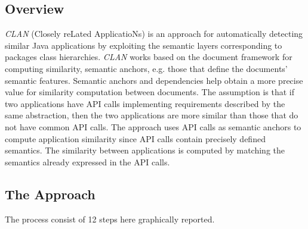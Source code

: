 \subsection{Overview}

\textit{CLAN} (Closely reLated ApplicatioNs) \cite{McMillan:2012:DSS:2337223.2337267} is an approach for automatically detecting similar Java applications by exploiting the semantic layers corresponding to packages class hierarchies. \textit{CLAN} works based on the document framework for computing similarity, semantic anchors, e.g. those that define the documents' semantic features. Semantic anchors and dependencies help obtain a more precise value for similarity computation between documents. The assumption is that if two applications have API calls implementing requirements described by the same abstraction, then the two applications are more similar than those that do not have common API calls. The approach uses API calls as semantic anchors to compute application similarity since API calls contain precisely defined semantics. The similarity between applications is computed by matching the semantics already expressed in the API calls.

\subsection{The Approach}

The process consist of 12 steps here graphically reported.


